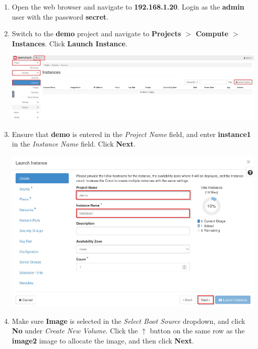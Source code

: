 \documentclass[letterpaper, 12pt]{article}
\begin{document}
\begin{enumerate}
    \item Open the web browser and navigate to \textbf{192.168.1.20}. Login as the \textbf{admin} user with the password
    \textbf{secret}.

    \item Switch to the \textbf{demo} project and navigate to
    \textbf{Projects $>$ Compute $>$ Instances}. Click \textbf{Launch Instance}.

    \begin{center}
        \includegraphics[width=\linewidth]{images/part4/step2.png}
    \end{center}

    \item Ensure that \textbf{demo} is entered in the \textit{Project Name} field, and enter \textbf{instance1} in the
    \textit{Instance Name} field. Click \textbf{Next}.
    
    \begin{center}
        \includegraphics[width=\linewidth]{images/part4/step3.png}
    \end{center}

    \item Make sure \textbf{Image} is selected in the \textit{Select Boot Source} dropdown, and click \textbf{No} under
    \textit{Create New Volume}. Click the $\uparrow$ button on the same row as the \textbf{image2} image to allocate the
    image, and then click \textbf{Next}.


\end{enumerate}
\end{document}

